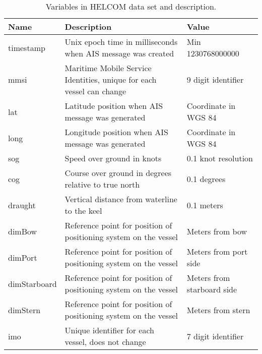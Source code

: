 \documentclass[../main.tex]{subfiles}
\begin{document}
\begin{table}[H]
\centering
\begin{tabular}{|l|m{7cm}|l|}
\hline
\rowcolor[HTML]{C0C0C0}
\textbf{Name} & \textbf{Description}                                                  & \textbf{Value}             \\ \hline
timestamp     & Unix epoch time in milliseconds when AIS message was created          & Min 1230768000000          \\ \hline
mmsi          & Maritime Mobile Service Identities, unique for each vessel can change & 9 digit identifier         \\ \hline
lat           & Latitude position when AIS message was generated                      & Coordinate in WGS 84       \\ \hline
long          & Longitude position when AIS message was generated                     & Coordinate in WGS 84       \\ \hline
sog           & Speed over ground in knots                                            & 0.1 knot resolution        \\ \hline
cog           & Course over ground in degrees relative to true north                  & 0.1 degrees                \\ \hline
draught       & Vertical distance from waterline to the keel                          & 0.1 meters                 \\ \hline
dimBow        & Reference point for position of positioning system on the vessel      & Meters from bow            \\ \hline
dimPort       & Reference point for position of positioning system on the vessel      & Meters from port side      \\ \hline
dimStarboard  & Reference point for position of positioning system on the vessel      & Meters from starboard side \\ \hline
dimStern      & Reference point for position of positioning system on the vessel      & Meters from stern          \\ \hline
imo           & Unique identifier for each vessel, does not change                    & 7 digit identifier         \\ \hline
\end{tabular}
\caption{Variables in HELCOM data set and description.}
\label{tabl:HELCOM-features}
\end{table}
\end{document}
